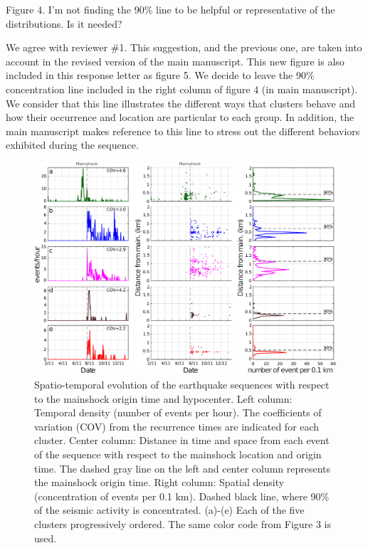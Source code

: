 \documentclass[10pt]{extarticle}
\begin{document}
\begin{ReviewerComment}{1}
\noindent 
Figure 4. I'm not finding the 90\% line to be helpful or representative of the distributions. Is it needed?
\end{ReviewerComment}


\begin{Answer}
 \WorkInProgressRevTask
We agree with reviewer \#1. This suggestion, and the previous one, are taken into account in the revised version of the main manuscript. This new figure is also included in this response letter as figure 5. We decide to leave the 90\% concentration line included in the right column of figure 4 (in main manuscript). We consider that this line illustrates the different ways that clusters behave and how their occurrence and location are particular to each group. In addition, the main manuscript makes reference to this line to stress out the different behaviors exhibited during the sequence.
\begin{figure}[!h]
\begin{center}
     \includegraphics[width=1\linewidth]{densities_plot}         \caption{Spatio-temporal evolution of the earthquake sequences with respect to the mainshock origin time and hypocenter. Left column: Temporal density (number of events per hour). The coefficients of variation (COV) from the recurrence times are indicated for each cluster. Center column: Distance in time and space from each event of the sequence with respect to the mainshock location and origin time. The dashed gray line on the left and center column represents the mainshock origin time. Right column: Spatial density (concentration of events per 0.1 km). Dashed black line, where 90\% of the seismic activity is concentrated. (a)-(e) Each of the five clusters progressively ordered. The same color code from Figure 3 is used.}
\end{center}
\label{fig:new_fig_4}
\end{figure}
\end{Answer}
%
%
\end{document}
